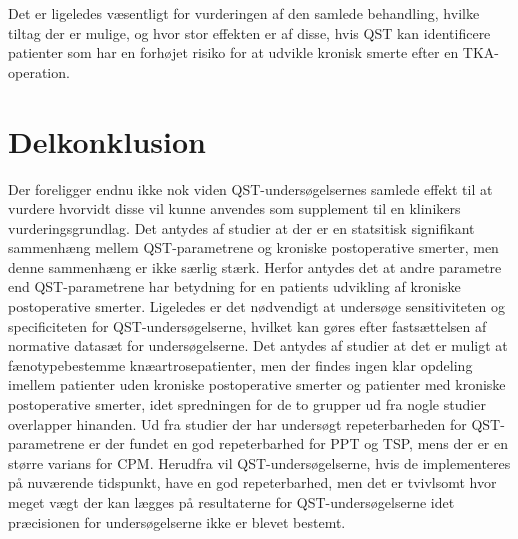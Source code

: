Det er ligeledes væsentligt for vurderingen af den samlede behandling, hvilke tiltag der er mulige, og hvor stor effekten er af disse, hvis QST kan identificere patienter som har en forhøjet risiko for at udvikle kronisk smerte efter en TKA-operation.

\section{Delkonklusion}
Der foreligger endnu ikke nok viden QST-undersøgelsernes samlede effekt til at vurdere hvorvidt disse vil kunne anvendes som supplement til en klinikers vurderingsgrundlag. Det antydes af studier at der er en statsitisk signifikant sammenhæng mellem QST-parametrene og kroniske postoperative smerter, men denne sammenhæng er ikke særlig stærk. Herfor antydes det at andre parametre end QST-parametrene har betydning for en patients udvikling af kroniske postoperative smerter. Ligeledes er det nødvendigt at undersøge sensitiviteten og specificiteten for QST-undersøgelserne, hvilket kan gøres efter fastsættelsen af normative datasæt for undersøgelserne. Det antydes af studier at det er muligt at fænotypebestemme knæartrosepatienter, men der findes ingen klar opdeling imellem patienter uden kroniske postoperative smerter og patienter med kroniske postoperative smerter, idet spredningen for de to grupper ud fra nogle studier overlapper hinanden. Ud fra studier der har undersøgt repeterbarheden for QST-parametrene er der fundet en god repeterbarhed for PPT og TSP, mens der er en større varians for CPM. Herudfra vil QST-undersøgelserne, hvis de implementeres på nuværende tidspunkt, have en god repeterbarhed, men det er tvivlsomt hvor meget vægt der kan lægges på resultaterne for QST-undersøgelserne idet præcisionen for undersøgelserne ikke er blevet bestemt.  

